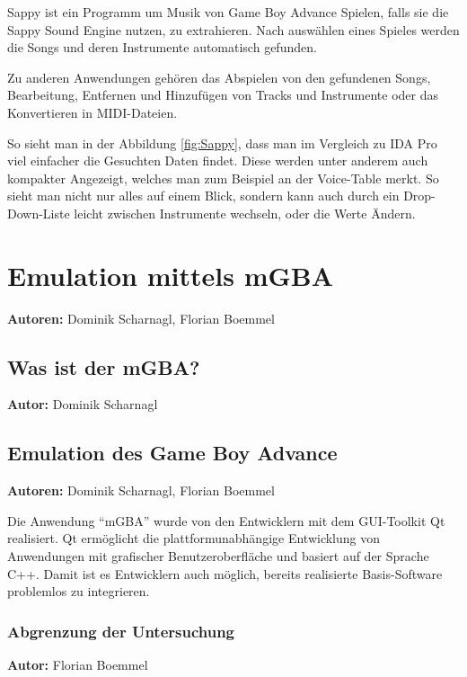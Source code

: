 \documentclass[11pt,a4paper]{scrartcl}
\newcommand{\AutorDominik} {
    \vspace{-4mm}
    \large \textbf{Autor:} Dominik Scharnagl \normalsize
    \vspace{2mm}
}
\newcommand{\AutorDominikFlorian} {
    \vspace{-4mm}
    \large \textbf{Autoren:} Dominik Scharnagl, Florian Boemmel \normalsize
    \vspace{2mm}
}
\newcommand{\AutorFlorian} {
    \vspace{-4mm}
    \large \textbf{Autor:} Florian Boemmel \normalsize
    \vspace{2mm}
}
\begin{document}
Sappy ist ein Programm um Musik von Game Boy Advance Spielen, falls sie die Sappy Sound Engine nutzen, zu extrahieren. Nach ausw\"{a}hlen eines Spieles werden die Songs und deren Instrumente automatisch gefunden.

Zu anderen Anwendungen geh\"{o}ren das Abspielen von den gefundenen Songs, Bearbeitung, Entfernen und Hinzuf\"{u}gen von Tracks und Instrumente oder das Konvertieren in MIDI-Dateien.

So sieht man in der Abbildung \ref{fig:Sappy}, dass man im Vergleich zu IDA Pro viel einfacher die Gesuchten Daten findet. Diese werden unter anderem auch kompakter Angezeigt, welches man zum Beispiel an der Voice-Table merkt. So sieht man nicht nur alles auf einem Blick, sondern kann auch durch ein Drop-Down-Liste leicht zwischen Instrumente wechseln, oder die Werte \"{A}ndern.


\newpage


\section{Emulation mittels mGBA} \label{EmulationMittelsMGBA}
\AutorDominikFlorian


\subsection{Was ist der mGBA?}
\AutorDominik


\subsection{Emulation des Game Boy Advance} \label{EmulationGameBoyAdvance}
\AutorDominikFlorian

Die Anwendung \enquote{mGBA} wurde von den Entwicklern mit dem GUI-Toolkit Qt realisiert. Qt erm\"oglicht die plattformunabh\"angige Entwicklung von Anwendungen mit grafischer Benutzeroberfl\"ache und basiert auf der Sprache C++. Damit ist es Entwicklern auch m\"oglich, bereits realisierte Basis-Software problemlos zu integrieren.


\subsubsection{Abgrenzung der Untersuchung}
\AutorFlorian
\end{document}
